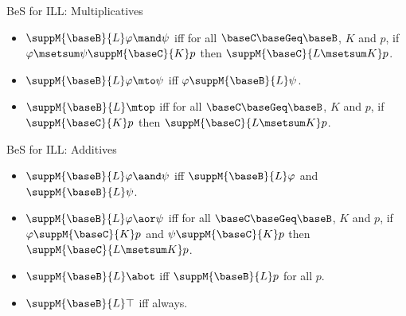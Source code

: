 \documentclass{beamer}
\begin{document}
\begin{frame}{BeS for ILL: Multiplicatives}
	\begin{itemize}
	\item $\suppM{\baseB}{L}\varphi\mand\psi$ iff for all $\baseC\baseGeq\baseB$, $K$ and $p$, if $\varphi\msetsum\psi\suppM{\baseC}{K}p$ then $\suppM{\baseC}{L\msetsum K}p$.\vspace{0.3cm}
	\item $\suppM{\baseB}{L}\varphi\mto\psi$ iff $\varphi\suppM{\baseB}{L}\psi$.\vspace{0.3cm}
	\item $\suppM{\baseB}{L}\mtop$ iff for all $\baseC\baseGeq\baseB$, $K$ and $p$, if $\suppM{\baseC}{K}p$ then $\suppM{\baseC}{L\msetsum K}p$.\vspace{0.3cm}
	\end{itemize}
\end{frame}
\begin{frame}{BeS for ILL: Additives}
	\begin{itemize}
	\item $\suppM{\baseB}{L}\varphi\aand\psi$ iff $\suppM{\baseB}{L}\varphi$ and $\suppM{\baseB}{L}\psi$.\vspace{0.3cm}
	\item $\suppM{\baseB}{L}\varphi\aor\psi$ iff for all $\baseC\baseGeq\baseB$, $K$ and $p$, if $\varphi\suppM{\baseC}{K}p$ and $\psi\suppM{\baseC}{K}p$ then $\suppM{\baseC}{L\msetsum K}p$.\vspace{0.3cm}
	\item $\suppM{\baseB}{L}\abot$ iff $\suppM{\baseB}{L}p$ for all $p$.\vspace{0.3cm}
	\item $\suppM{\baseB}{L}\top$ iff always.\vspace{0.3cm}
	\end{itemize}
\end{frame}
\end{document}
